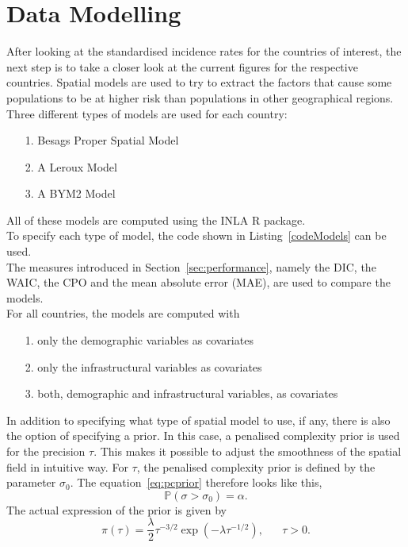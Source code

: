 \section{Data Modelling}
After looking at the standardised incidence rates for the countries of interest, the next step is to take a closer look at the current figures for the respective countries. Spatial models are used to try to extract the factors that cause some populations to be at higher risk than populations in other geographical regions. Three different types of models are used for each country:
\begin{itemize}
    \item[1.] Besags Proper Spatial Model
    \item[2.] A Leroux Model
    \item[3.] A BYM2 Model
\end{itemize}
All of these models are computed using the INLA \cite{rinla} R package. \\
To specify each type of model, the code shown in Listing~\ref{codeModels} can be used. \\
The measures introduced in Section~\ref{sec:performance}, namely the DIC, the WAIC, the CPO and the mean absolute error (MAE), are used to compare the models.\\
For all countries, the models are computed with
\begin{itemize}
    \item[1.] only the demographic variables as covariates
    \item[2.] only the infrastructural variables as covariates
    \item[3.] both, demographic and infrastructural variables, as covariates
\end{itemize}
In addition to specifying what type of spatial model to use, if any, there is also the option of specifying a prior. In this case, a penalised complexity prior is used for the precision $\tau$. This makes it possible to adjust the smoothness of the spatial field in intuitive way. For $\tau$, the penalised complexity prior is defined by the parameter $\sigma_0$. The equation~\ref{eq:pcprior} therefore looks like this,
\begin{equation}\label{pcprec}
    \mathbb{P}\left(\sigma > \sigma_0\right)=\alpha.
\end{equation}
The actual expression of the prior is given by
\begin{equation}
    \pi\left(\tau\right)=\frac{\lambda}{2}\tau^{-3/2}\exp\left(-\lambda\tau^{-1/2}\right),\hspace{20pt}\tau>0.
\end{equation}

